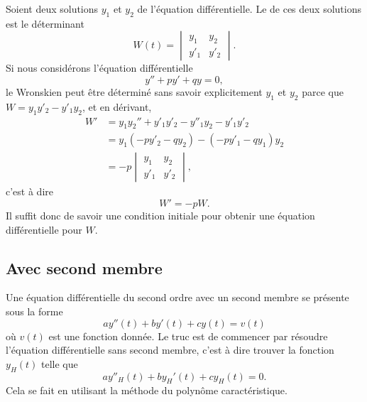 Soient deux solutions \( y_1\) et \( y_2\) de l'équation différentielle. Le  de ces deux solutions est le déterminant
\begin{equation}
    W(t)=\begin{vmatrix}
        y_1    &   y_2    \\ 
        y'_1    &   y'_2    
    \end{vmatrix}.
\end{equation}
Si nous considérons l'équation différentielle
\begin{equation}
    y''+py'+qy=0,
\end{equation}
le Wronskien peut être déterminé sans savoir explicitement \( y_1\) et \( y_2\) parce que \( W=y_1y'_2-y'_1y_2\), et en dérivant,
\begin{subequations}
    \begin{align}
        W'&=y_1y_2''+y'_1y'_2-y''_1y_2-y'_1y'_2\\
        &=y_1(-py'_2-qy_2)-(-py'_1-qy_1)y_2\\
        &=-p\begin{vmatrix}
            y_1    &   y_2    \\ 
            y'_1    &   y'_2    
        \end{vmatrix},
    \end{align}
\end{subequations}
c'est à dire
\begin{equation}    \label{EqHEMRgM}
    W'=-pW.
\end{equation}
Il suffit donc de savoir une condition initiale pour obtenir une équation différentielle pour \( W\).

\subsection{Avec second membre}

Une équation différentielle du second ordre avec un second membre se présente sous la forme
\begin{equation}
	ay''(t)+by'(t)+cy(t)=v(t)
\end{equation}
où $v(t)$ est une fonction donnée. Le truc est de commencer par résoudre l'équation différentielle sans second membre, c'est à dire trouver la fonction $y_H(t)$ telle que
\begin{equation}
	ay''_H(t)+by_H'(t)+cy_H(t)=0.
\end{equation}
Cela se fait en utilisant la méthode du polynôme caractéristique.

